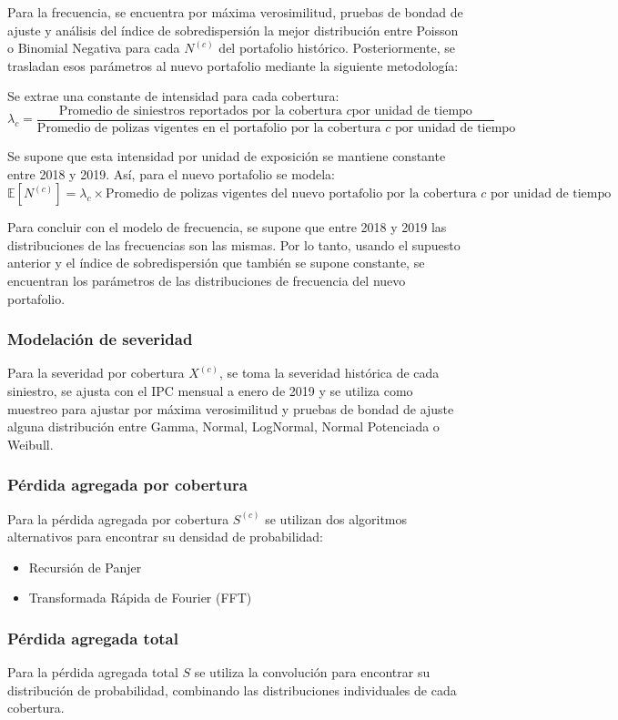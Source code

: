 Para la frecuencia, se encuentra por máxima verosimilitud, pruebas de bondad de ajuste y análisis del índice de sobredispersión la mejor distribución entre Poisson o Binomial Negativa para cada $N^{(c)}$ del portafolio histórico. Posteriormente, se trasladan esos parámetros al nuevo portafolio mediante la siguiente metodología:

Se extrae una constante de intensidad para cada cobertura:
\begin{equation*}
\lambda_c = \frac{\text{Promedio de siniestros reportados por la cobertura } c \text{por unidad de tiempo}}{\text{Promedio de polizas vigentes en el portafolio por la cobertura } c \text{ por unidad de tiempo}}
\end{equation*}

Se supone que esta intensidad por unidad de exposición se mantiene constante entre 2018 y 2019. Así, para el nuevo portafolio se modela:
\begin{equation*}
\mathbb{E}[N^{(c)}] = \lambda_c \times \text{Promedio de polizas vigentes del nuevo portafolio por la cobertura } c \text{ por unidad de tiempo}
\end{equation*}

Para concluir con el modelo de frecuencia, se supone que entre 2018 y 2019 las distribuciones de las frecuencias son las mismas. Por lo tanto, usando el supuesto anterior y el índice de sobredispersión que también se supone constante, se encuentran los parámetros de las distribuciones de frecuencia del nuevo portafolio.

\subsubsection{Modelación de severidad}

Para la severidad por cobertura $X^{(c)}$, se toma la severidad histórica de cada siniestro, se ajusta con el IPC mensual a enero de 2019 y se utiliza como muestreo para ajustar por máxima verosimilitud y pruebas de bondad de ajuste alguna distribución entre Gamma, Normal, LogNormal, Normal Potenciada o Weibull.

\subsubsection{Pérdida agregada por cobertura}

Para la pérdida agregada por cobertura $S^{(c)}$ se utilizan dos algoritmos alternativos para encontrar su densidad de probabilidad:
\begin{itemize}
    \item Recursión de Panjer
    \item Transformada Rápida de Fourier (FFT)
\end{itemize}

\subsubsection{Pérdida agregada total}

Para la pérdida agregada total $S$ se utiliza la convolución para encontrar su distribución de probabilidad, combinando las distribuciones individuales de cada cobertura.